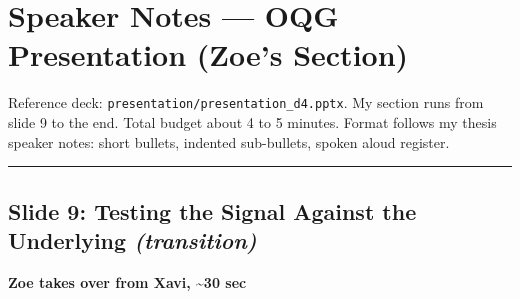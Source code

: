 \documentclass[
]{article}
\author{}
\date{\vspace{-2.5em}}
\begin{document}
\section{Speaker Notes --- OQG Presentation (Zoe's
Section)}\label{speaker-notes-oqg-presentation-zoes-section}

Reference deck: \texttt{presentation/presentation\_d4.pptx}. My section
runs from slide 9 to the end. Total budget about 4 to 5 minutes. Format
follows my thesis speaker notes: short bullets, indented sub-bullets,
spoken aloud register.

\begin{center}\rule{0.5\linewidth}{0.5pt}\end{center}

\subsection{\texorpdfstring{Slide 9: Testing the Signal Against the
Underlying
\emph{(transition)}}{Slide 9: Testing the Signal Against the Underlying (transition)}}\label{slide-9-testing-the-signal-against-the-underlying-transition}

\textbf{Zoe takes over from Xavi, \textasciitilde30 sec}
\end{document}
